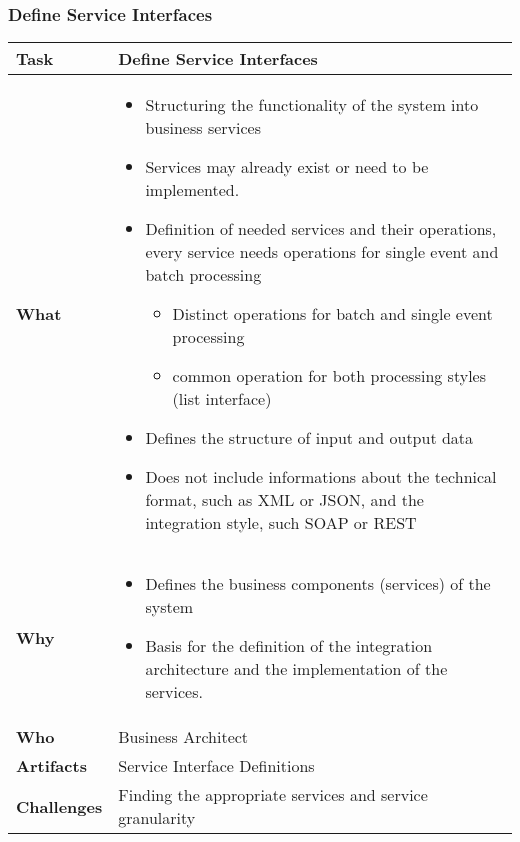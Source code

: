 \subsubsection{Define Service Interfaces}
\begin{tabularx}{\textwidth}{@{} l X @{}}
	\caption{Define Service Interfaces} \label{table:ch6_Task_Define_Service_Interfaces}\\
	\toprule
	\bfseries Task & Define Service Interfaces\\
	\midrule\bfseries What & 
	\begin{itemize}
		\item Structuring the functionality of the system into business services
		\item Services may already exist or need to be implemented.
		\item Definition of needed services and their operations, every service needs operations for single event and batch processing
		\begin{itemize}
			\item Distinct operations for batch and single event processing
			\item common operation for both processing styles (list interface)
		\end{itemize}
		\item Defines the structure of input and output data
		\item Does not include informations about the technical format, such as \ac{XML} or \ac{JSON}, and the integration style, such SOAP or \ac{REST}
	\end{itemize}
	\\
	\midrule
	\bfseries Why &
	\begin{itemize}
		\item Defines the business components (services) of the system
		\item Basis for the definition of the integration architecture and the implementation of the services.
	\end{itemize}\\
	\midrule
	\bfseries Who & Business Architect\\
	\midrule
	\bfseries Artifacts & Service Interface Definitions\\
	\midrule
	\bfseries Challenges & Finding the appropriate services and service granularity\\
	\bottomrule
\end{tabularx}

